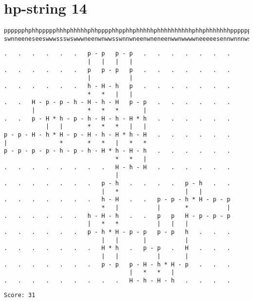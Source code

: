 \documentclass[a4paper,oneside,article,11pt]{memoir}
\begin{document}
\pagebreak

\section*{hp-string 14}
\begin{lstlisting}[basicstyle=\fontsize{6}{11}\ttfamily]
pppppphphhppppphhhphhhhhphhpppphhpphhphhhhhphhhhhhhhhhphhphhhhhhhppppppppppphhhhhhhpphphhhpppppphphh
swnneeneseeswwwssswswwwneenwnwwsswnnwneenwneneenwwnwwwwneeeeesennwnnnwswnwsseeswwwwwwseswwwseeeeeee
\end{lstlisting}
\begin{lstlisting}[basicstyle=\fontsize{8}{11}\ttfamily]
.   .   .   .   .   .   p - p   p - p   .   .   .   .   .   .   .  
                        |   |   |   |                              
.   .   .   .   .   .   p   p - p   p   .   .   .   .   .   .   .  
                        |           |                              
.   .   .   .   .   .   h - H - h   p   .   .   .   .   .   .   .  
                        *   *   |   |                              
.   .   H - p - p - h - H - h - H   p - p   .   .   .   .   .   .  
        |               *   *   *       |                          
.   .   p - H * h - p - h - H - h - H * h   .   .   .   .   .   .  
            |   |       *   *   *   |   |                          
p - p - H - h * H - p - H - h - H * h - H   .   .   .   .   .   .  
|               *       *   *   |   *   *                          
p - p - p - p - h - p - h - H * h - H - h   .   .   .   .   .   .  
                                *   *   |                          
.   .   .   .   .   .   .   .   H - h - H   .   .   .   .   .   .  
                                |                                  
.   .   .   .   .   .   .   p - h   .   .   .   .   p - h   .   .  
                            |   *                   |   |          
.   .   .   .   .   .   .   h - H   .   .   p - p - h * H - p - p  
                            *   |           |       *           |  
.   .   .   .   .   .   h - H - h   .   .   p   p   H - p - p - p  
                        |   *   *           |   |   |              
.   .   .   .   .   .   p - h * H - p - p   p - p   h   .   .   .  
                            |   |       |           |              
.   .   .   .   .   .   .   H * h   .   p - p   .   H   .   .   .  
                            |   |           |       |              
.   .   .   .   .   .   .   p - p   p - H - h * H - p   .   .   .  
                                    |   *   *   |                  
.   .   .   .   .   .   .   .   .   H - h - H - h   .   .   .   .

\end{lstlisting}
\begin{lstlisting}
Score: 31
\end{lstlisting}
\end{document}
